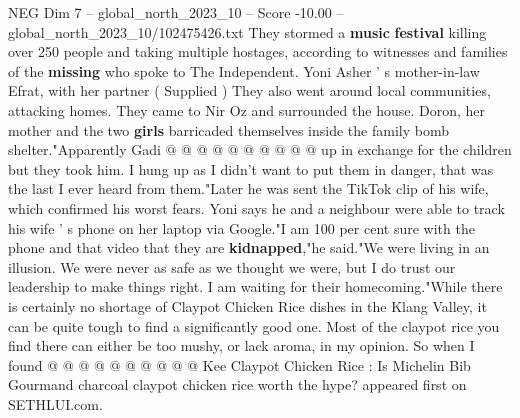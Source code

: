 \begin{textsample}{NEG Dim 7 – global\_north\_2023\_10 – Score -10.00 – global\_north\_2023\_10/102475426.txt}
They stormed a \textbf{music} \textbf{festival} killing over 250 people and taking multiple hostages, according to witnesses and families of the \textbf{missing} who spoke to The Independent.
Yoni Asher ' s mother-in-law Efrat, with her partner ( Supplied ) They also went around local communities, attacking homes.
They came to Nir Oz and surrounded the house.
Doron, her mother and the two \textbf{girls} barricaded themselves inside the family bomb shelter."Apparently Gadi @ @ @ @ @ @ @ @ @ @ up in exchange for the children but they took him.
I hung up as I didn't want to put them in danger, that was the last I ever heard from them."Later he was sent the TikTok clip of his wife, which confirmed his worst fears.
Yoni says he and a neighbour were able to track his wife ' s phone on her laptop via Google."I am 100 per cent sure with the phone and that video that they are \textbf{kidnapped},"he said."We were living in an illusion.
We were never as safe as we thought we were, but I do trust our leadership to make things right.
I am waiting for their homecoming."While there is certainly no shortage of Claypot Chicken Rice dishes in the Klang Valley, it can be quite tough to find a significantly good one.
Most of the claypot rice you find there can either be too mushy, or lack aroma, in my opinion.
So when I found @ @ @ @ @ @ @ @ @ @ Kee Claypot Chicken Rice : Is Michelin Bib Gourmand charcoal claypot chicken rice worth the hype? appeared first on SETHLUI.com.

\end{textsample}
